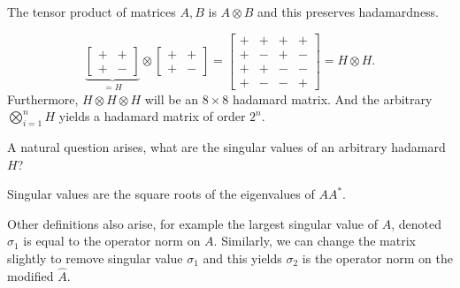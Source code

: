 \begin{recall}
	The tensor product of matrices \(A, B\) is \(A \otimes B\) and this preserves hadamardness.
\end{recall}
\begin{example}
	\[
	\underbrace{	\begin{bmatrix} +&+\\
		+&-\end{bmatrix}}_{=H}  \otimes \begin{bmatrix} +&+\\
			+&-\end{bmatrix} = \begin{bmatrix} +&+&+&+\\
		+&-&+&-\\
	+&+&-&-\\
+&-&-&+\end{bmatrix} = H \otimes H
	.\]
Furthermore, \(H \otimes H \otimes H\) will be an \(8 \times 8\) hadamard matrix. And the arbitrary \(\bigotimes_{i=1}^{n} H\) yields a hadamard matrix of order \(2^{n}\).
\end{example}
A natural question arises, what are the singular values of an arbitrary hadamard \(H\)?
\begin{recall}
	Singular values are the square roots of the eigenvalues of \(A A^{*}\).
\end{recall}
Other definitions also arise, for example the largest singular value of \(A\), denoted \(\sigma_1\) is equal to the operator norm on \(A\). Similarly, we can change the matrix slightly to remove singular value \(\sigma_1\) and this yields \(\sigma_2\) is the operator norm on the modified \(\hat{A}\).\\


